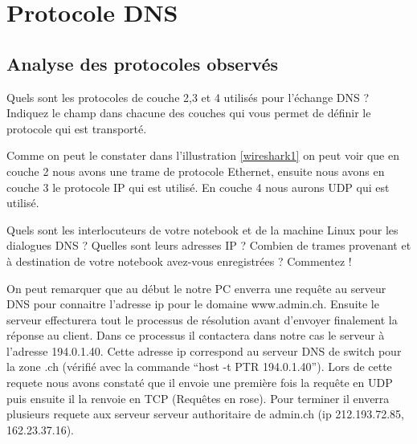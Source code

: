 \documentclass[a4paper, 12pt]{article}
\begin{document}
\section{Protocole DNS}
\subsection{Analyse des protocoles observés}

\begin{question}[resume]
\item Quels sont les protocoles de couche 2,3 et 4 utilisés pour l'échange DNS ? Indiquez le champ dans chacune des couches qui vous permet de définir le protocole qui est transporté.
\end{question}


Comme on peut le constater dans l'illustration \ref{wireshark1} on peut voir que en couche 2 nous avons une trame de protocole Ethernet, ensuite nous avons en couche 3 le protocole IP qui est utilisé. En couche 4 nous aurons UDP qui est utilisé.

\begin{question}[resume]
\item Quels sont les interlocuteurs de votre notebook et de la machine Linux pour les dialogues DNS ? Quelles sont leurs adresses IP ? Combien de trames provenant et à destination de votre notebook avez-vous enregistrées ? Commentez !
\end{question}




On peut remarquer que au début le notre PC enverra une requête au serveur DNS pour connaitre l'adresse ip pour le domaine www.admin.ch. Ensuite le serveur effecturera tout le processus de résolution avant d'envoyer finalement la réponse au client. Dans ce processus il contactera dans notre cas le serveur à l'adresse 194.0.1.40. Cette adresse ip correspond au serveur DNS de switch pour la zone .ch (vérifié avec la commande ``host -t PTR 194.0.1.40''). Lors de cette requete nous avons constaté que il envoie une première fois la requête en UDP puis ensuite il la renvoie en TCP (Requêtes en rose). Pour terminer il enverra plusieurs requete aux serveur serveur authoritaire de admin.ch (ip 212.193.72.85, 162.23.37.16).
\end{document}
